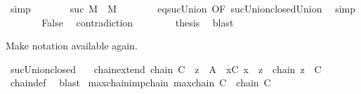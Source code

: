 \begin{isabellebody}
\ simp\isanewline
\ \ \ \ \isamarkupfalse%
\ \isamarkupfalse%
\ {\isachardoublequoteopen}suc\ {\isacharquery}{\kern0pt}M\ {\isacharequal}{\kern0pt}\ {\isacharquery}{\kern0pt}M{\isachardoublequoteclose}\isanewline
\ \ \ \ \ \ \isamarkupfalse%
\ eq{\isacharunderscore}{\kern0pt}suc{\isacharunderscore}{\kern0pt}Union\ {\isacharbrackleft}{\kern0pt}OF\ suc{\isacharunderscore}{\kern0pt}Union{\isacharunderscore}{\kern0pt}closed{\isacharunderscore}{\kern0pt}Union{\isacharbrackright}{\kern0pt}\ \isamarkupfalse%
\ simp\isanewline
\ \ \ \ \isamarkupfalse%
\ \isamarkupfalse%
\ False\ \isamarkupfalse%
\ contradiction\isanewline
\ \ \isamarkupfalse%
\isanewline
\ \ \isamarkupfalse%
\ \isamarkupfalse%
\ {\isacharquery}{\kern0pt}thesis\ \isamarkupfalse%
\ blast\isanewline
{}\isamarkupfalse%
%
\endisatagproof
{\isafoldproof}%
%
\isadelimproof
%
\endisadelimproof
%
\begin{isamarkuptext}%
Make notation \isa{{\isasymC}} available again.%
\end{isamarkuptext}\isamarkuptrue%
\isamarkupfalse%
\ suc{\isacharunderscore}{\kern0pt}Union{\isacharunderscore}{\kern0pt}closed\ \ {\isacharparenleft}{\kern0pt}{\isachardoublequoteopen}{\isasymC}{\isachardoublequoteclose}{\isacharparenright}{\kern0pt}\isanewline
\isanewline
{}\isamarkupfalse%
\ chain{\isacharunderscore}{\kern0pt}extend{\isacharcolon}{\kern0pt}\ {\isachardoublequoteopen}chain\ C\ {\isasymLongrightarrow}\ z\ {\isasymin}\ A\ {\isasymLongrightarrow}\ {\isasymforall}x{\isasymin}C{\isachardot}{\kern0pt}\ x\ {\isasymsqsubseteq}\ z\ {\isasymLongrightarrow}\ chain\ {\isacharparenleft}{\kern0pt}{\isacharbraceleft}{\kern0pt}z{\isacharbraceright}{\kern0pt}\ {\isasymunion}\ C{\isacharparenright}{\kern0pt}{\isachardoublequoteclose}\isanewline
%
\isadelimproof
\ \ %
\endisadelimproof
%
\isatagproof
{}\isamarkupfalse%
\ chain{\isacharunderscore}{\kern0pt}def\ \isamarkupfalse%
\ blast%
\endisatagproof
{\isafoldproof}%
%
\isadelimproof
\isanewline
%
\endisadelimproof
\isanewline
{}\isamarkupfalse%
\ maxchain{\isacharunderscore}{\kern0pt}imp{\isacharunderscore}{\kern0pt}chain{\isacharcolon}{\kern0pt}\ {\isachardoublequoteopen}maxchain\ C\ {\isasymLongrightarrow}\ chain\ C{\isachardoublequoteclose}\isanewline
%
\isadelimproof
\ \ %
\endisadelimproof

\end{isabellebody}
